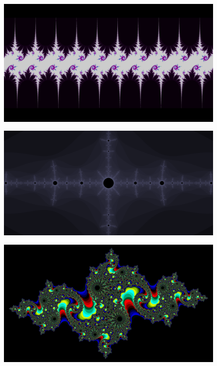 \documentclass{article}
\begin{document}
\begin{figure}[H]
	\includegraphics[width=\linewidth]{Utils/article_dependencies/Honorable_mentions/1.png}
\end{figure}

\begin{figure}[H]
	\includegraphics[width=\linewidth]{Utils/article_dependencies/Honorable_mentions/2.png}
\end{figure}

\begin{figure}[H]
	\includegraphics[width=\linewidth]{Utils/article_dependencies/Honorable_mentions/3.png}
\end{figure}
\end{document}
